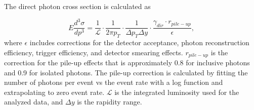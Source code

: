 \documentclass[twocolumn,letterpaper,aps,prl,longbibliography,superscriptaddress,floatfix]{revtex4-2}
\newcommand{\pizero}{\ensuremath{\pi^0}}
\begin{document}

The direct photon cross section is calculated as

\begin{equation} \label{eq:xsecex}
E\frac{d^3\sigma}{dp^3} = \frac{1}{\mathcal{L}} \cdot \frac{1}{2\pi p_T} \cdot \frac{1}{\Delta p_T \Delta y} \cdot \frac{\gamma_{dir} \cdot r_{pile-up}}{\epsilon},
\end{equation}
where $\epsilon$ includes corrections for the detector acceptance, photon reconstruction efficiency, trigger efficiency, and detector smearing effects. $r_{pile-up}$ is the correction for the pile-up effects that is approximately 0.8 for inclusive photons and 0.9 for isolated photons. The pile-up correction is calculated by fitting the number of photons per event vs the event rate with a log function and extrapolating to zero event rate. $\mathcal{L}$ is the integrated luminosity used for the analyzed data, and $\Delta y$ is the rapidity range. 
\end{document}
